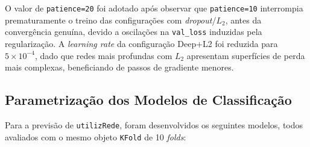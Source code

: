 \documentclass[conference]{IEEEtran}
\begin{document}
\begin{table}[htbp]
\caption{Configurações da Rede Neuronal --- Regressão}
\label{tab:nn_reg}
\centering
{}
\end{table}

O valor de \texttt{patience=20} foi adotado após observar que \texttt{patience=10} interrompia prematuramente o treino das configurações com \textit{dropout}/$L_2$, antes da convergência genuína, devido a oscilações na \texttt{val\_loss} induzidas pela regularização. A \textit{learning rate} da configuração Deep+L2 foi reduzida para $5\times10^{-4}$, dado que redes mais profundas com $L_2$ apresentam superfícies de perda mais complexas, beneficiando de passos de gradiente menores.

\subsection{Parametrização dos Modelos de Classificação}

Para a previsão de \texttt{utilizRede}, foram desenvolvidos os seguintes modelos, todos avaliados com o mesmo objeto \texttt{KFold} de 10 \textit{folds}:
\end{document}
